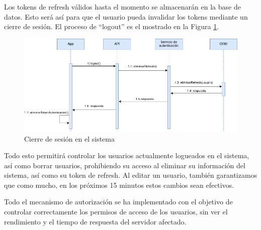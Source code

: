 Los tokens de refresh válidos hasta el momento se almacenarán en la base de datos. Esto será así para que el usuario pueda invalidar los tokens mediante un cierre de sesión. El proceso de ``logout'' es el mostrado en la Figura \ref{fig:ds-logout}.   

\begin{figure}[]
    \centering
    \includegraphics[width=\textwidth]{diseno/sistema/DS/logout.png}
    \caption{Cierre de sesión en el sistema}
    \label{fig:ds-logout}
\end{figure}

Todo esto permitirá controlar los usuarios actualmente logueados en el sistema, así como borrar usuarios, prohibiendo su acceso al eliminar su información del sistema, así como su token de refresh. Al editar un usuario, también garantizamos que como mucho, en los próximos 15 minutos estos cambios sean efectivos.

Todo el mecanismo de autorización se ha implementado con el objetivo de controlar correctamente los permisos de acceso de los usuarios, sin ver el rendimiento y el tiempo de respuesta del servidor afectado. 
